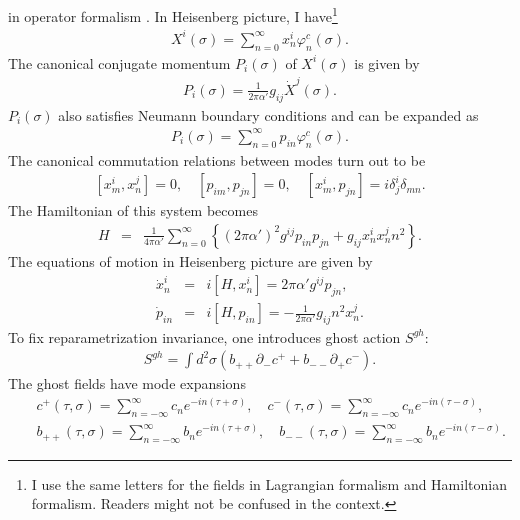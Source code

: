 \documentclass[a4paper,12pt]{article}
\newcommand{\co}{\varphi^c}
\begin{document}
in operator formalism \cite{GJ,Samuel,Cremmer,NOhta}.
%
%
In Heisenberg picture, I have\footnote{
I use the same letters for the fields in
Lagrangian formalism
and Hamiltonian formalism.
Readers might not be confused in the context.
}
\begin{eqnarray}
 \label{NoBX}
X^i(\sigma) =
\sum_{n=0}^{\infty}
x^i_n \co_n(\sigma).
\end{eqnarray}
%
%
The canonical conjugate momentum $P_i(\sigma)$
of $X^i(\sigma)$
is given by
\begin{eqnarray}
 \label{NoBP}
P_i(\sigma)
= \frac{1}{2\pi\alpha'} g_{ij} \dot{X}^j(\sigma).
\end{eqnarray}
$P_i(\sigma)$ also 
satisfies Neumann boundary conditions and 
can be expanded as
\begin{eqnarray}
 \label{NoBPmod}
P_i(\sigma)
=\sum_{n=0}^{\infty} p_{in} \co_n (\sigma).
\end{eqnarray}
The canonical commutation relations
between modes 
turn out to be
\begin{eqnarray}
 \label{comcom}
[x_m^i,x_n^j]=0, \quad [p_{im},p_{j n}] = 0, \quad 
[x_m^i,p_{j n}] = i \delta^i_j \delta_{mn} .
\end{eqnarray}
The Hamiltonian of this system becomes
\begin{eqnarray}
 \label{Hmode}
H
&=&
\frac{1}{4\pi\alpha'}
\sum_{n=0}^\infty
\left\{
(2\pi\alpha')^2g^{ij} 
p_{in}p_{jn}
+
g_{ij} x^i_n x^j_n n^2
\right\} .
\end{eqnarray}
The equations of motion in Heisenberg picture are given by
\begin{eqnarray}
\dot{x}_n^i &=& i [H, x_n^i] = 2\pi\alpha' g^{ij} p_{jn}, \\
\dot{p}_{in}&=& i [H,p_{in}] 
= - \frac{1}{2\pi\alpha'} g_{ij}n^2 x^j_n.
\end{eqnarray}
%
%
To fix 
reparametrization invariance,
one introduces ghost action $S^{gh}$:
\begin{eqnarray}
S^{gh}
=
\int d^2\sigma
\left(
b_{++} \partial_- c^+
+
b_{--} \partial_+ c^-
\right).
\end{eqnarray}
The ghost fields have mode expansions
\begin{eqnarray}
 \label{cmodes}
&&c^+ (\tau,\sigma) 
= \sum_{n=-\infty}^{\infty}
c_n e^{-in(\tau+\sigma)}, \quad
c^- (\tau,\sigma) 
= \sum_{n=-\infty}^{\infty}
c_n e^{-in(\tau-\sigma)}, \\
&&b_{++} (\tau,\sigma) =
\sum_{n=-\infty}^{\infty}
b_n e^{-in(\tau+\sigma)},\quad 
b_{--} (\tau,\sigma) =
\sum_{n=-\infty}^{\infty}
b_n e^{-in(\tau-\sigma)}. 
\end{eqnarray}
\end{document}
